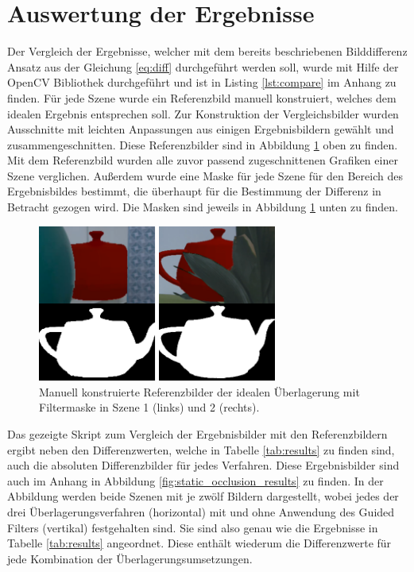 \section{Auswertung der Ergebnisse}

Der Vergleich der Ergebnisse, welcher mit dem bereits beschriebenen Bilddifferenz Ansatz aus der Gleichung \ref{eq:diff} durchgeführt werden soll, wurde mit Hilfe der OpenCV Bibliothek durchgeführt und ist in Listing \ref{lst:compare} im Anhang zu finden. Für jede Szene wurde ein Referenzbild manuell konstruiert, welches dem idealen Ergebnis entsprechen soll. Zur Konstruktion der Vergleichsbilder wurden Ausschnitte mit leichten Anpassungen aus einigen Ergebnisbildern gewählt und zusammengeschnitten. Diese Referenzbilder sind in Abbildung \ref{fig:reference} oben zu finden. Mit dem Referenzbild wurden alle zuvor passend zugeschnittenen Grafiken einer Szene verglichen. Außerdem wurde eine Maske für jede Szene für den Bereich des Ergebnisbildes bestimmt, die überhaupt für die Bestimmung der Differenz in Betracht gezogen wird. Die Masken sind jeweils in Abbildung \ref{fig:reference} unten zu finden.

\begin{figure}[h]
  \centering
	\includegraphics[width=0.7\textwidth]{content/images/evaluation/reference.png} 
  \caption{Manuell konstruierte Referenzbilder der idealen Überlagerung mit Filtermaske in Szene 1 (links) und 2 (rechts).}
  \label{fig:reference}
\end{figure}

Das gezeigte Skript zum Vergleich der Ergebnisbilder mit den Referenzbildern ergibt neben den Differenzwerten, welche in Tabelle \ref{tab:results} zu finden sind, auch die absoluten Differenzbilder für jedes Verfahren. Diese Ergebnisbilder sind auch im Anhang in Abbildung \ref{fig:static_occlusion_results} zu finden. In der Abbildung werden beide Szenen mit je zwölf Bildern dargestellt, wobei jedes der drei Überlagerungsverfahren (horizontal) mit und ohne Anwendung des Guided Filters (vertikal) festgehalten sind. Sie sind also genau wie die Ergebnisse in Tabelle \ref{tab:results} angeordnet. Diese enthält wiederum die Differenzwerte für jede Kombination der Überlagerungsumsetzungen.


